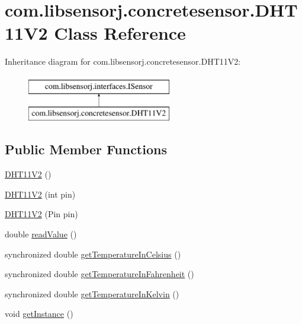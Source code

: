 \hypertarget{classcom_1_1libsensorj_1_1concretesensor_1_1DHT11V2}{}\section{com.\+libsensorj.\+concretesensor.\+D\+H\+T11\+V2 Class Reference}
\label{classcom_1_1libsensorj_1_1concretesensor_1_1DHT11V2}
Inheritance diagram for com.\+libsensorj.\+concretesensor.\+D\+H\+T11\+V2\+:\begin{figure}[H]
\begin{center}
\leavevmode
\includegraphics[height=2.000000cm]{classcom_1_1libsensorj_1_1concretesensor_1_1DHT11V2}
\end{center}
\end{figure}
\subsection*{Public Member Functions}
\begin{DoxyCompactItemize}
\item 
\hyperlink{classcom_1_1libsensorj_1_1concretesensor_1_1DHT11V2_a19e1a415c048669c7b4879e02d852682}{D\+H\+T11\+V2} ()
\item 
\hyperlink{classcom_1_1libsensorj_1_1concretesensor_1_1DHT11V2_a2c1a20a2c6796b8dd17629edaa9b4591}{D\+H\+T11\+V2} (int pin)
\item 
\hyperlink{classcom_1_1libsensorj_1_1concretesensor_1_1DHT11V2_a8c3dea8106eef93e12d61f7a7e32e5ca}{D\+H\+T11\+V2} (Pin pin)
\item 
double \hyperlink{classcom_1_1libsensorj_1_1concretesensor_1_1DHT11V2_a883913b8d65fc3e747e22374a8d16bc2}{read\+Value} ()
\item 
synchronized double \hyperlink{classcom_1_1libsensorj_1_1concretesensor_1_1DHT11V2_a3d5619f9ad57662d352dd9ddbf729a23}{get\+Temperature\+In\+Celsius} ()
\item 
synchronized double \hyperlink{classcom_1_1libsensorj_1_1concretesensor_1_1DHT11V2_aa1a825351fad9bd7b0c97abae4a89e05}{get\+Temperature\+In\+Fahrenheit} ()
\item 
synchronized double \hyperlink{classcom_1_1libsensorj_1_1concretesensor_1_1DHT11V2_a86989c9de8a041c8ca9f6f03c0714200}{get\+Temperature\+In\+Kelvin} ()
\item 
void \hyperlink{classcom_1_1libsensorj_1_1concretesensor_1_1DHT11V2_afff27f29285f26230faa8ecda6b6b102}{get\+Instance} ()
\end{DoxyCompactItemize}
